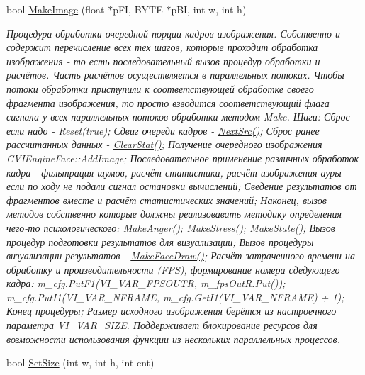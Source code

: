 \begin{DoxyCompactItemize}
bool \hyperlink{class_c_v_i_engine_base_a3426944a03bac2f5a8c135c217f9cf8c}{Make\+Image} (float $\ast$p\+F\+I, B\+Y\+T\+E $\ast$p\+B\+I, int w, int h)
\begin{DoxyCompactList}\small\item\em Процедура обработки очередной порции кадров изображения. Собственно и содержит перечисление всех тех шагов, которые проходит обработка изображения -\/ то есть последовательный вызов процедур обработки и расчётов. Часть расчётов осуществляется в параллельных потоках. Чтобы потоки обработки приступили к соответствующей обработке своего фрагмента изображения, то просто взводится соответствующий флага сигнала у всех параллельных потоков обработки методом Make. Шаги\+: Сброс если надо -\/ Reset(true); Сдвиг очереди кадров -\/ \hyperlink{class_c_v_i_engine_base_aa1aa2604f40dd77bc49ca6ff8fd81535}{Next\+Src()}; Сброс ранее рассчитанных данных -\/ \hyperlink{class_c_v_i_engine_base_a10d6138a2c8f4c4c946bf930c268be6b}{Clear\+Stat()}; Получение очередного изображения C\+V\+I\+Engine\+Face\+::\+Add\+Image; Последовательное применение различных обработок кадра -\/ фильтрация шумов, расчёт статистики, расчёт изображения ауры -\/ если по ходу не подали сигнал остановки вычислений; Сведение результатов от фрагментов вместе и расчёт статистических значений; Наконец, вызов методов собственно которые должны реализовавать методику определения чего-\/то психологического\+: \hyperlink{class_c_v_i_engine_base_adf949a2b1abf18f519937d3f787c5abf}{Make\+Anger()}; \hyperlink{class_c_v_i_engine_base_a746c67a403f60418bf26e1e686db0c0c}{Make\+Stress()}; \hyperlink{class_c_v_i_engine_base_aa77b261660041465a8d3e68a7088dd0d}{Make\+State()}; Вызов процедур подготовки результатов для визуализации; Вызов процедуры визуализации результатов -\/ \hyperlink{class_c_v_i_engine_base_a18c5dc58d55a37295b3dd4c451fb86fc}{Make\+Face\+Draw()}; Расчёт затраченного времени на обработку и производительности (F\+P\+S), формирование номера сдедующего кадра\+: m\+\_\+cfg.\+Put\+F1(V\+I\+\_\+\+V\+A\+R\+\_\+\+F\+P\+S\+O\+U\+T\+R, m\+\_\+fps\+Out\+R.\+Put()); m\+\_\+cfg.\+Put\+I1(V\+I\+\_\+\+V\+A\+R\+\_\+\+N\+F\+R\+A\+M\+E, m\+\_\+cfg.\+Get\+I1(\+V\+I\+\_\+\+V\+A\+R\+\_\+\+N\+F\+R\+A\+M\+E) + 1); Конец процедуры; Размер исходного изображения берётся из настроечного параметра V\+I\+\_\+\+V\+A\+R\+\_\+\+S\+I\+Z\+E. Поддерживает блокирование ресурсов для возможности использования функции из нескольких параллельных процессов. \end{DoxyCompactList}\item 
bool \hyperlink{class_c_v_i_engine_base_a930661f73cc7c449c166071631be595d}{Set\+Size} (int w, int h, int cnt)

\end{DoxyCompactItemize}
